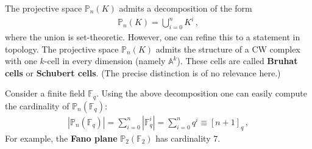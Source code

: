     \begin{property}
        The projective space $\mathbb{P}_n(K)$ admits a decomposition of the form
        \begin{gather}
            \mathbb{P}_n(K) = \bigcup_{i=0}^nK^i\,,
        \end{gather}
        where the union is set-theoretic. However, one can refine this to a statement in topology. The projective space $\mathbb{P}_n(K)$ admits the structure of a CW complex with one $k$-cell in every dimension (namely $\mathbb{A}^k$). These cells are called \textbf{Bruhat cells} or \textbf{Schubert cells}. (The precise distinction is of no relevance here.)
    \end{property}

    \begin{example}
        Consider a finite field $\mathbb{F}_q$. Using the above decomposition one can easily compute the cardinality of $\mathbb{P}_n(\mathbb{F}_q)$:
        \begin{gather}
            |\mathbb{P}_n(\mathbb{F}_q)| = \sum_{i=0}^n|\mathbb{F}_q^i| = \sum_{i=0}^nq^i \equiv [n+1]_q\,,
        \end{gather}
        For example, the \textbf{Fano plane} $\mathbb{P}_2(\mathbb{F}_2)$ has cardinality 7.
    \end{example}

